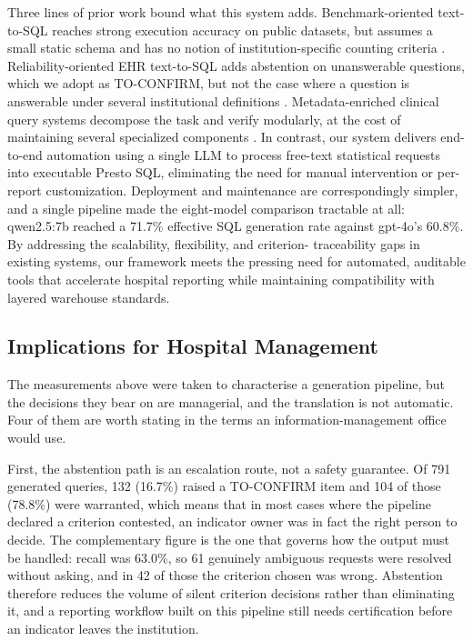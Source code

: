 \documentclass[applsci,article,submit,pdftex,oneauthor]{Definitions/mdpi}
\begin{document}
Three lines of prior work bound what this system adds. Benchmark-oriented text-to-SQL reaches strong execution accuracy on public datasets, but assumes a small static schema and has no notion of institution-specific counting criteria \cite{yu2018,guo2019,bogin2019,tsqlsurvey2024}. Reliability-oriented EHR text-to-SQL adds abstention on unanswerable questions, which we adopt as TO-CONFIRM, but not the case where a question is answerable under several institutional definitions \cite{ehrsql2024}. Metadata-enriched clinical query systems decompose the task and verify modularly, at the cost of maintaining several specialized components \cite{metaclin2025,sqlthought2025}. In contrast, our system delivers end-to-end
automation using a single LLM to process free-text statistical requests into
executable Presto SQL, eliminating the need for manual intervention or
per-report customization. Deployment and maintenance are correspondingly simpler, and a single pipeline made the eight-model comparison tractable at all: qwen2.5:7b reached a 71.7\% effective SQL generation rate against gpt-4o's 60.8\%. By addressing the scalability, flexibility, and criterion-
traceability gaps in existing systems, our framework meets the pressing need for
automated, auditable tools that accelerate hospital reporting while maintaining
compatibility with layered warehouse standards.

\subsection{Implications for Hospital Management}\label{sec:mgmt}
The measurements above were taken to characterise a generation pipeline, but the
decisions they bear on are managerial, and the translation is not automatic. Four
of them are worth stating in the terms an information-management office would use.

First, the abstention path is an escalation route, not a safety guarantee. Of 791
generated queries, 132 (16.7\%) raised a TO-CONFIRM item and 104 of those
(78.8\%) were warranted, which means that in most cases where the pipeline
declared a criterion contested, an indicator owner was in fact the right person to
decide. The complementary figure is the one that governs how the output must be
handled: recall was 63.0\%, so 61 genuinely ambiguous requests were resolved
without asking, and in 42 of those the criterion chosen was wrong. Abstention
therefore reduces the volume of silent criterion decisions rather than eliminating
it, and a reporting workflow built on this pipeline still needs certification
before an indicator leaves the institution.
\end{document}
